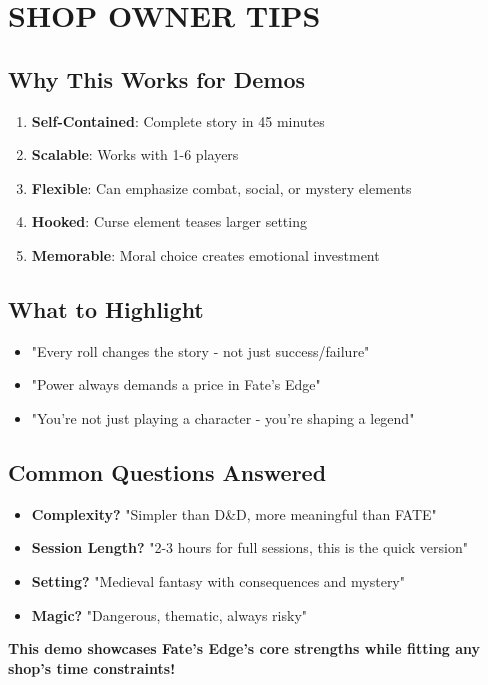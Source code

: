 \documentclass[12pt]{article}
\begin{document}
\section{SHOP OWNER TIPS}

\subsection*{Why This Works for Demos}
\begin{enumerate}
\item \textbf{Self-Contained}: Complete story in 45 minutes
\item \textbf{Scalable}: Works with 1-6 players  
\item \textbf{Flexible}: Can emphasize combat, social, or mystery elements
\item \textbf{Hooked}: Curse element teases larger setting
\item \textbf{Memorable}: Moral choice creates emotional investment
\end{enumerate}

\subsection*{What to Highlight}
\begin{itemize}
\item "Every roll changes the story - not just success/failure"
\item "Power always demands a price in Fate's Edge"
\item "You're not just playing a character - you're shaping a legend"
\end{itemize}

\subsection*{Common Questions Answered}
\begin{itemize}
\item \textbf{Complexity?} "Simpler than D&D, more meaningful than FATE"
\item \textbf{Session Length?} "2-3 hours for full sessions, this is the quick version"  
\item \textbf{Setting?} "Medieval fantasy with consequences and mystery"
\item \textbf{Magic?} "Dangerous, thematic, always risky"
\end{itemize}

\begin{center}
\textbf{This demo showcases Fate's Edge's core strengths while fitting any shop's time constraints!}
\end{center}
\end{document}
